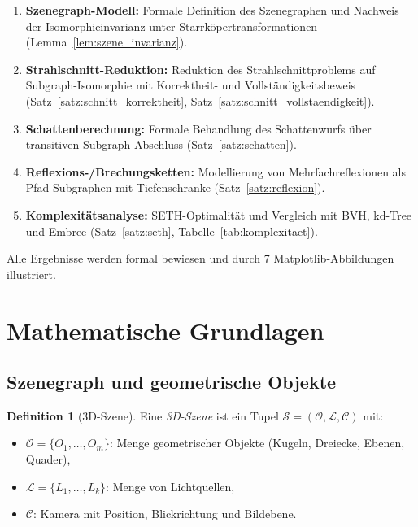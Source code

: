 ﻿\documentclass[a4paper,12pt]{article}
\theoremstyle{definition}
\newtheorem{definition}{Definition}[section]
\begin{document}
\begin{enumerate}
  \item \textbf{Szenegraph-Modell:} Formale Definition des Szenegraphen
        und Nachweis der Isomorphieinvarianz unter
        Starrköpertransformationen
        (Lemma~\ref{lem:szene_invarianz}).
  \item \textbf{Strahlschnitt-Reduktion:} Reduktion des
        Strahlschnittproblems auf Subgraph-Isomorphie mit Korrektheit-
        und Vollständigkeitsbeweis
        (Satz~\ref{satz:schnitt_korrektheit},
        Satz~\ref{satz:schnitt_vollstaendigkeit}).
  \item \textbf{Schattenberechnung:} Formale Behandlung des
        Schattenwurfs über transitiven Subgraph-Abschluss
        (Satz~\ref{satz:schatten}).
  \item \textbf{Reflexions-/Brechungsketten:} Modellierung von
        Mehrfachreflexionen als Pfad-Subgraphen mit Tiefenschranke
        (Satz~\ref{satz:reflexion}).
  \item \textbf{Komplexitätsanalyse:} SETH-Optimalität und Vergleich
        mit BVH, kd-Tree und Embree
        (Satz~\ref{satz:seth},
        Tabelle~\ref{tab:komplexitaet}).
\end{enumerate}

Alle Ergebnisse werden formal bewiesen und durch 7
Matplotlib-Abbildungen illustriert.

\section{Mathematische Grundlagen}

\subsection{Szenegraph und geometrische Objekte}

\begin{definition}[3D-Szene]
  \label{def:szene}
  Eine \emph{3D-Szene} ist ein Tupel
  $\mathcal{S} = (\mathcal{O}, \mathcal{L}, \mathcal{C})$ mit:
  \begin{itemize}
    \item $\mathcal{O} = \{O_1, \ldots, O_m\}$: Menge geometrischer
          Objekte (Kugeln, Dreiecke, Ebenen, Quader),
    \item $\mathcal{L} = \{L_1, \ldots, L_k\}$: Menge
          von Lichtquellen,
    \item $\mathcal{C}$: Kamera mit Position, Blickrichtung und
          Bildebene.
  \end{itemize}
\end{definition}
\end{document}
